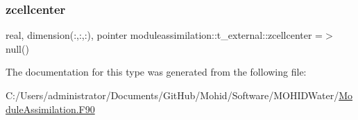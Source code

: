 \subsubsection{\texorpdfstring{zcellcenter}{zcellcenter}}
{\footnotesize\ttfamily real, dimension(\+:,\+:,\+:), pointer moduleassimilation\+::t\+\_\+external\+::zcellcenter =$>$ null()\hspace{0.3cm}{\ttfamily [private]}}



The documentation for this type was generated from the following file\+:\begin{DoxyCompactItemize}
\item 
C\+:/\+Users/administrator/\+Documents/\+Git\+Hub/\+Mohid/\+Software/\+M\+O\+H\+I\+D\+Water/\mbox{\hyperlink{_module_assimilation_8_f90}{Module\+Assimilation.\+F90}}\end{DoxyCompactItemize}
